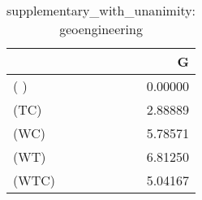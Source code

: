 \begin{table}
\centering
\caption{supplementary_with_unanimity: geoengineering}
\begin{tabular}{lr}
\toprule
{} &       G \\
\midrule
( )   & 0.00000 \\
(TC)  & 2.88889 \\
(WC)  & 5.78571 \\
(WT)  & 6.81250 \\
(WTC) & 5.04167 \\
\bottomrule
\end{tabular}
\end{table}
